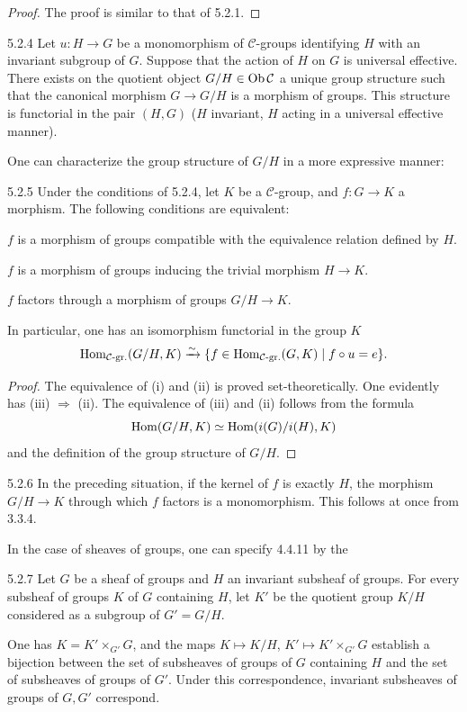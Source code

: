 \begin{proof}
The proof is similar to that of 5.2.1.
\end{proof}
\begin{corollary}{5.2.4}\label{IV.5.2.4}
Let \(u:H\to G\) be a monomorphism of \(\mathcal C\)-groups
identifying \(H\) with an invariant subgroup of \(G\).
Suppose that the action of \(H\) on \(G\) is universal
effective. There exists on the quotient object
\(G/H\in\operatorname{Ob}\mathcal C\) a unique group structure such
that the canonical morphism \(G\to G/H\) is a morphism
of groups. This structure is functorial in the pair
\((H,G)\) (\(H\) invariant, \(H\) acting in a universal
effective manner).
\end{corollary}
One can characterize the group structure of \(G/H\)
in a more expressive manner:
\begin{proposition}{5.2.5}\label{IV.5.2.5}
Under the conditions of 5.2.4, let \(K\) be a
\(\mathcal C\)-group, and \(f:G\to K\) a morphism.
The following conditions are equivalent:
\begin{enumeratei}
\item \(f\) is a morphism of groups compatible with
the equivalence relation defined by \(H\).
\item \(f\) is a morphism of groups inducing the
trivial morphism \(H\to K\).
\item \(f\) factors through a morphism of groups \(G/H\to K\).
\end{enumeratei}
In particular, one has an isomorphism functorial in the group \(K\)
\[
\operatorname{Hom}_{\mathcal C\text{-gr.}}(G/H,K)
\xrightarrow{\sim}\{f\in\operatorname{Hom}_{\mathcal C\text{-gr.}}(G,K)\mid f\circ u=e\}.
\]
\end{proposition}
\begin{proof}
The equivalence of (i) and (ii) is proved set-theoretically.
One evidently has (iii) \(\Rightarrow\) (ii).
The equivalence of (iii) and (ii) follows from the formula
\[
\operatorname{Hom}(G/H,K)\simeq\operatorname{Hom}(i(G)/i(H),K)
\]
and the definition of the group structure of \(G/H\).
\end{proof}
\begin{remark}{5.2.6}\label{IV.5.2.6}
In the preceding situation, if the kernel of \(f\)
is exactly \(H\), the morphism \(G/H\to K\) through
which \(f\) factors is a monomorphism.
This follows at once from 3.3.4.
\end{remark}
In the case of sheaves of groups, one can specify 4.4.11 by the
\begin{proposition}{5.2.7}\label{IV.5.2.7}
Let \(G\) be a sheaf of groups and \(H\) an invariant
subsheaf of groups. For every subsheaf of groups \(K\)
of \(G\) containing \(H\), let \(K'\) be the quotient
group \(K/H\) considered as a subgroup of \(G'=G/H\).

One has \(K=K'\times_{G'}G\), and the maps
\(K\mapsto K/H\), \(K'\mapsto K'\times_{G'}G\)
establish a bijection between the set of subsheaves
of groups of \(G\) containing \(H\) and the set of
subsheaves of groups of \(G'\).
Under this correspondence, invariant subsheaves of
groups of \(G,G'\) correspond.
\end{proposition}
